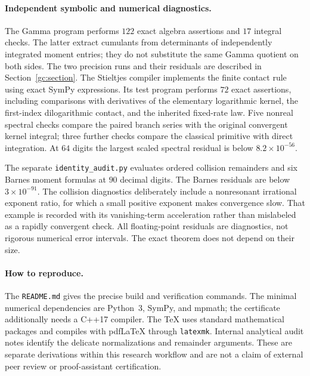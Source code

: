 \paragraph{Independent symbolic and numerical diagnostics.}
The Gamma program performs $122$ exact algebra assertions and $17$
integral checks. The latter extract cumulants from determinants of
independently integrated moment entries; they do not substitute the
same Gamma quotient on both sides. The two precision runs and their
residuals are described in Section~\ref{gc:section}.
The Stieltjes compiler implements the finite contact rule using exact
SymPy expressions. Its test program performs $72$ exact assertions,
including comparisons with derivatives of the elementary logarithmic
kernel, the first-index dilogarithmic contact, and the inherited
fixed-rate law. Five nonreal spectral checks compare the paired branch
series with the original convergent kernel integral; three further
checks compare the classical primitive with direct integration.
At $64$ digits the largest scaled spectral residual is below
$8.2\times10^{-56}$.

The separate \texttt{identity\_audit.py} evaluates ordered collision
remainders and six Barnes moment formulas at $90$ decimal digits.
The Barnes residuals are below $3\times10^{-91}$. The collision
diagnostics deliberately include a nonresonant irrational exponent
ratio, for which a small positive exponent makes convergence slow.
That example is recorded with its vanishing-term acceleration rather
than mislabeled as a rapidly convergent check. All floating-point
residuals are diagnostics, not rigorous numerical error intervals.
The exact theorem does not depend on their size.

\paragraph{How to reproduce.}
The \texttt{README.md} gives the precise build and verification
commands. The minimal numerical dependencies are Python~3,
SymPy, and mpmath; the certificate additionally needs a C++17
compiler. The TeX uses standard mathematical packages and compiles
with pdfLaTeX through \texttt{latexmk}. Internal analytical audit
notes identify the delicate normalizations and remainder arguments.
These are separate derivations within this research workflow and are
not a claim of external peer review or proof-assistant certification.
